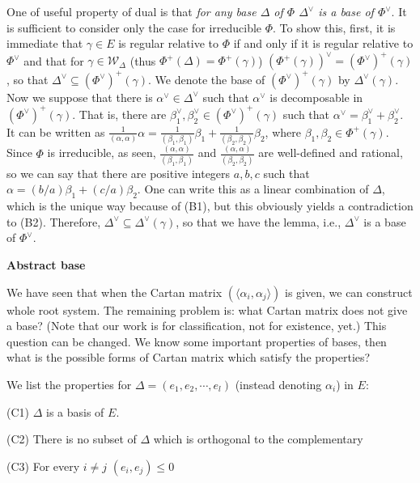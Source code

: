 \documentclass{article}
\begin{document}
One of useful property of dual is that \textit{for any base $\Delta$ of $\Phi$ $\Delta^\vee$ is a base of $\Phi^\vee$}.
It is sufficient to consider only the case for irreducible $\Phi$.
To show this, first, it is immediate that $\gamma \in E$ is regular relative to $\Phi$ if and only if it is regular relative to $\Phi^\vee$ and that for $\gamma \in \mathcal{W}_\Delta$ (thus $\Phi^+(\Delta) = \Phi^+(\gamma)$) $(\Phi^+(\gamma))^\vee = (\Phi^\vee)^+(\gamma)$, so that $\Delta^\vee \subseteq (\Phi^\vee)^+(\gamma)$.
We denote the base of $(\Phi^\vee)^+(\gamma)$ by $\Delta^\vee(\gamma)$.
Now we suppose that there is $\alpha^\vee \in \Delta^\vee$ such that $\alpha^\vee$ is decomposable in $(\Phi^\vee)^+(\gamma)$.
That is, there are $\beta_1^\vee, \beta_2^\vee \in (\Phi^\vee)^+(\gamma)$ such that $\alpha^\vee = \beta_1^\vee + \beta_2^\vee$.
It can be written as $\frac{1}{(\alpha, \alpha)} \alpha = \frac{1}{(\beta_1, \beta_1)} \beta_1 + \frac{1}{(\beta_2, \beta_2)} \beta_2$, where $\beta_1, \beta_2 \in \Phi^+(\gamma)$.
Since $\Phi$ is irreducible, as seen, $\frac{(\alpha, \alpha)}{(\beta_1, \beta_1)}$ and $\frac{(\alpha, \alpha)}{(\beta_2, \beta_2)}$ are well-defined and rational, so we can say that there are positive integers $a, b, c$ such that $\alpha = (b/a)\beta_1 + (c/a)\beta_2$.
One can write this as a linear combination of $\Delta$, which is the unique way because of (B1), but this obviously yields a contradiction to (B2).
Therefore, $\Delta^\vee \subseteq \Delta^\vee(\gamma)$, so that we have the lemma, i.e., $\Delta^\vee$ is a base of $\Phi^\vee$.

\newpage

\textbf{Abstract base}

We have seen that when the Cartan matrix $(\langle \alpha_i, \alpha_j \rangle)$ is given, we can construct whole root system.
The remaining problem is: what Cartan matrix does not give a base?
(Note that our work is for classification, not for existence, yet.)
This question can be changed.
We know some important properties of bases, then what is the possible forms of Cartan matrix which satisfy the properties?

We list the properties for $\Delta = (e_1, e_2, \cdots, e_l)$ (instead denoting $\alpha_i$) in $E$:

(C1) $\Delta$ is a basis of $E$.

(C2) There is no subset of $\Delta$ which is orthogonal to the complementary

(C3) For every $i \ne j$ $(e_i, e_j) \le 0$
\end{document}
